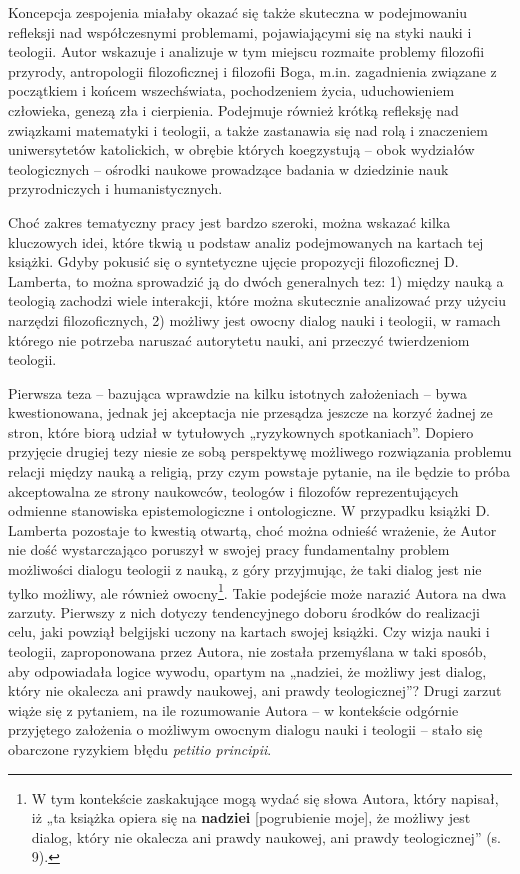 \documentclass[a4paper]{article}
\begin{document}
Koncepcja zespojenia miałaby okazać się także skuteczna w podejmowaniu refleksji nad współczesnymi problemami,
pojawiającymi się na styki nauki i teologii. Autor wskazuje i analizuje w tym miejscu rozmaite problemy filozofii
przyrody, antropologii filozoficznej i filozofii Boga, m.in. zagadnienia związane z początkiem i końcem wszechświata,
pochodzeniem życia, uduchowieniem człowieka, genezą zła i cierpienia. Podejmuje również krótką refleksję nad związkami
matematyki i teologii, a także zastanawia się nad rolą i znaczeniem uniwersytetów katolickich, w obrębie których
koegzystują – obok wydziałów teologicznych – ośrodki naukowe prowadzące badania w dziedzinie nauk przyrodniczych i
humanistycznych.

Choć zakres tematyczny pracy jest bardzo szeroki, można wskazać kilka kluczowych idei, które tkwią u podstaw analiz
podejmowanych na kartach tej książki. Gdyby pokusić się o syntetyczne ujęcie propozycji filozoficznej D. Lamberta, to
można sprowadzić ją do dwóch generalnych tez: 1) między nauką a teologią zachodzi wiele interakcji, które można
skutecznie analizować przy użyciu narzędzi filozoficznych, 2) możliwy jest owocny dialog nauki i teologii, w ramach
którego nie potrzeba naruszać autorytetu nauki, ani przeczyć twierdzeniom teologii. 

Pierwsza teza – bazująca wprawdzie na kilku istotnych założeniach – bywa kwestionowana, jednak jej akceptacja nie
przesądza jeszcze na korzyć żadnej ze stron, które biorą udział w tytułowych „ryzykownych spotkaniach”. Dopiero
przyjęcie drugiej tezy niesie ze sobą perspektywę możliwego rozwiązania problemu relacji między nauką a religią, przy
czym powstaje pytanie, na ile będzie to próba akceptowalna ze strony naukowców, teologów i filozofów reprezentujących
odmienne stanowiska epistemologiczne i ontologiczne. W przypadku książki D. Lamberta pozostaje to kwestią otwartą, choć
można odnieść wrażenie, że Autor nie dość wystarczająco poruszył w swojej pracy fundamentalny problem możliwości
dialogu teologii z nauką, z góry przyjmując, że taki dialog jest nie tylko możliwy, ale również owocny\footnote{ W tym
kontekście zaskakujące mogą wydać się słowa Autora, który napisał, iż „ta książka opiera się na \textbf{nadziei}
[pogrubienie moje], że możliwy jest dialog, który nie okalecza ani prawdy naukowej, ani prawdy teologicznej” (s. 9).}.
Takie podejście może narazić Autora na dwa zarzuty. Pierwszy z nich dotyczy tendencyjnego doboru środków do realizacji
celu, jaki powziął belgijski uczony na kartach swojej książki. Czy wizja nauki i teologii, zaproponowana przez Autora,
nie została przemyślana w taki sposób, aby odpowiadała logice wywodu, opartym na „nadziei, że możliwy jest dialog,
który nie okalecza ani prawdy naukowej, ani prawdy teologicznej”? Drugi zarzut wiąże się z pytaniem, na ile rozumowanie
Autora – w kontekście odgórnie przyjętego założenia o możliwym owocnym dialogu nauki i teologii – stało się obarczone
ryzykiem błędu \textit{petitio principii}.
\end{document}
